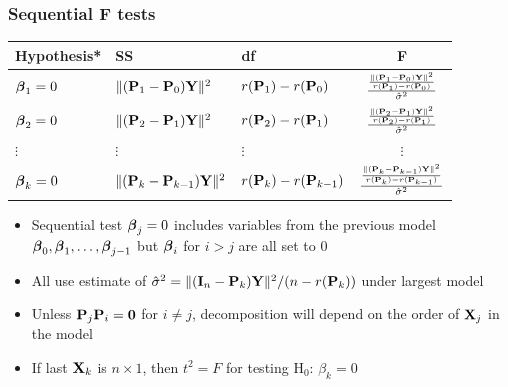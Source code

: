 \documentclass[handout]{beamer}
\begin{document}
\begin{frame}
  \frametitle{Sequential F tests}

  \begin{tabular}{lllc} \hline
    Hypothesis* & SS & df & F \\ \hline
$\b_1 = 0$ & $\| (\P_1 - \P_0) \Y \|^2$ & $r(\P_1) - r(\P_0)$ & $
\frac{\frac{\| (\P_1 - \P_0) \Y \|^2} {r(\P_1) - r(\P_0) }}{\shat}$
\pause \\
$\b_2 = 0$ & $\| (\P_2 - \P_1) \Y \|^2$ & $r(\P_2) - r(\P_1)$ & $ \frac{\frac{\| (\P_
2 - \P_1) \Y \|^2} {r(\P_2) - r(\P_1) }}{\shat}$  \pause \\
$\vdots$ &$\vdots$ & $\vdots$& $\vdots$ \\
 $\b_k = 0$ & $\| (\P_k - \P_{k-1}) \Y \|^2$ & $r(\P_k) - r(\P_{k-1})$ & $ \frac{\frac{\| (\P_
k - \P_{k-1}) \Y \|^2} {r(\P_k) - r(\P_{k-1}) }}{\shat}$  \pause
  \end{tabular}
  \begin{itemize}
  \item Sequential test $\b_j = 0$ includes variables from the
    previous model $\b_0, \b_1,\ldots, \b_{j-1}$ but $\b_i$ for $i >
    j$ are all set to $0$  \pause
  \item All use estimate of $\shat =  \|(\I_n -
    \P_k)\Y\|^2 /(n - r(\P_k))$ under largest model
 \pause
  \item Unless $\P_j\P_i = \zero$ for $i \neq j$, decomposition will
    depend on the order of $\X_j$ in the model  \pause
  \item If last $\X_k$ is $n\times 1$, then $t^2 = F$  for testing H$_0$:
    $\beta_k = 0$  \pause
  \end{itemize}
\end{frame}
\end{document}
